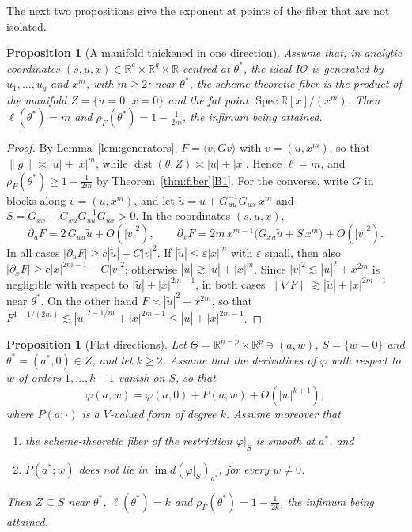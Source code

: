 \documentclass[11pt]{article}
\newtheorem{proposition}[lemma]{Proposition}
\theoremstyle{definition}
\theoremstyle{remark}
\newcommand{\R}{\mathbb{R}}
\newcommand{\cO}{\mathcal{O}}
\newcommand{\ip}[2]{\langle #1,#2\rangle}
\DeclareMathOperator{\dist}{dist}
\DeclareMathOperator{\Spec}{Spec}
\DeclareMathOperator{\im}{im}
\begin{document}
The next two propositions give the exponent at points of the fiber that are not isolated.

\begin{proposition}[A manifold thickened in one direction]\label{prop:curvilinear}
Assume that, in analytic coordinates $(s,u,x)\in\R^e\times\R^q\times\R$ centred at $\theta^*$, the ideal $I\cO$ is generated by $u_1,\dots,u_q$ and $x^m$, with $m\ge2$: near $\theta^*$, the scheme-theoretic fiber is the product of the manifold $Z=\{u=0,\,x=0\}$ and the fat point $\Spec\R[x]/(x^m)$. Then $\ell(\theta^*)=m$ and $\rho_F(\theta^*)=1-\frac1{2m}$, the infimum being attained.
\end{proposition}

\begin{proof}
By Lemma~\ref{lem:generators}, $F=\ip{v}{Gv}$ with $v=(u,x^m)$, so that $\|g\|\asymp|u|+|x|^m$, while $\dist(\theta,Z)\asymp|u|+|x|$. Hence $\ell=m$, and $\rho_F(\theta^*)\ge1-\frac1{2m}$ by Theorem~\ref{thm:fiber}\ref{B1}. For the converse, write $G$ in blocks along $v=(u,x^m)$, and let $\tilde u=u+G_{uu}^{-1}G_{ux}\,x^m$ and $S=G_{xx}-G_{xu}G_{uu}^{-1}G_{ux}>0$. In the coordinates $(s,u,x)$,
\[
\partial_uF=2\,G_{uu}\tilde u+O(|v|^2),\qquad\partial_xF=2m\,x^{m-1}\big(G_{xu}\tilde u+S\,x^m\big)+O(|v|^2).
\]
In all cases $|\partial_uF|\ge c|\tilde u|-C|v|^2$. If $|\tilde u|\le\varepsilon|x|^m$ with $\varepsilon$ small, then also $|\partial_xF|\ge c|x|^{2m-1}-C|v|^2$; otherwise $|\tilde u|\gtrsim|\tilde u|+|x|^m$. Since $|v|^2\lesssim|\tilde u|^2+x^{2m}$ is negligible with respect to $|\tilde u|+|x|^{2m-1}$, in both cases $\|\nabla F\|\gtrsim|\tilde u|+|x|^{2m-1}$ near $\theta^*$. On the other hand $F\asymp|\tilde u|^2+x^{2m}$, so that $F^{1-1/(2m)}\lesssim|\tilde u|^{2-1/m}+|x|^{2m-1}\le|\tilde u|+|x|^{2m-1}$.
\end{proof}

\begin{proposition}[Flat directions]\label{prop:flat}
Let $\Theta=\R^{n-p}\times\R^p\ni(a,w)$, $S=\{w=0\}$ and $\theta^*=(a^*,0)\in Z$, and let $k\ge2$. Assume that the derivatives of $\varphi$ with respect to $w$ of orders $1,\dots,k-1$ vanish on $S$, so that
\[
\varphi(a,w)=\varphi(a,0)+P(a;w)+O(|w|^{k+1}),
\]
where $P(a;\cdot)$ is a $V$-valued form of degree $k$. Assume moreover that
\begin{enumerate}[label=\textup{(\arabic*)},nosep]
\item the scheme-theoretic fiber of the restriction $\varphi|_S$ is smooth at $a^*$, and
\item $P(a^*;w)$ does not lie in $\im d(\varphi|_S)_{a^*}$, for every $w\ne0$.
\end{enumerate}
Then $Z\subseteq S$ near $\theta^*$, $\ell(\theta^*)=k$ and $\rho_F(\theta^*)=1-\frac1{2k}$, the infimum being attained.
\end{proposition}
\end{document}
